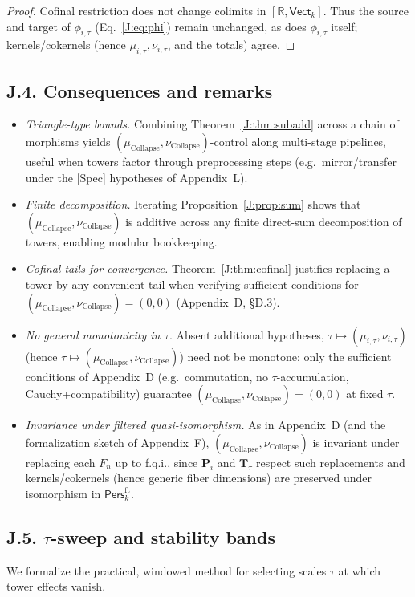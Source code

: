 \documentclass[11pt]{article}
\numberwithin{equation}{section}
\theoremstyle{plain}
\theoremstyle{definition}
\theoremstyle{remark}
\newcommand{\Pers}{\mathsf{Pers}}
\theoremstyle{plain}
\theoremstyle{definition}
\numberwithin{equation}{section}
\theoremstyle{definition}
\DeclareRobustCommand{\muc}{\mu_{\mathrm{Collapse}}}
\DeclareRobustCommand{\nuc}{\nu_{\mathrm{Collapse}}}
\numberwithin{equation}{section}
\theoremstyle{plain}
\theoremstyle{definition}
\theoremstyle{remark}
\providecommand{\muc}{\mu_{\mathrm{Collapse}}}
\providecommand{\nuc}{\nu_{\mathrm{Collapse}}}
\begin{document}
\begin{proof}
Cofinal restriction does not change colimits in \([\mathbb{R},\mathsf{Vect}_k]\).
Thus the source and target of \(\phi_{i,\tau}\) (Eq.~\eqref{J:eq:phi}) remain unchanged, as does \(\phi_{i,\tau}\) itself; kernels/cokernels (hence \(\mu_{i,\tau},\nu_{i,\tau}\), and the totals) agree.
\end{proof}

\subsection*{J.4. Consequences and remarks}
\begin{itemize}\itemsep0.25em
  \item \emph{Triangle-type bounds.} Combining Theorem~\ref{J:thm:subadd} across a chain of morphisms yields \((\muc,\nuc)\)-control along multi-stage pipelines, useful when towers factor through preprocessing steps (e.g.\ mirror/transfer under the [Spec] hypotheses of Appendix~L).
  \item \emph{Finite decomposition.} Iterating Proposition~\ref{J:prop:sum} shows that \((\muc,\nuc)\) is additive across any finite direct-sum decomposition of towers, enabling modular bookkeeping.
  \item \emph{Cofinal tails for convergence.} Theorem~\ref{J:thm:cofinal} justifies replacing a tower by any convenient tail when verifying sufficient conditions for \((\muc,\nuc)=(0,0)\) (Appendix~D, §D.3).
  \item \emph{No general monotonicity in \(\tau\).} Absent additional hypotheses, \(\tau\mapsto(\mu_{i,\tau},\nu_{i,\tau})\) (hence \(\tau\mapsto(\muc,\nuc)\)) need not be monotone; only the sufficient conditions of Appendix~D (e.g.\ commutation, no \(\tau\)-accumulation, Cauchy+compatibility) guarantee \((\muc,\nuc)=(0,0)\) at fixed \(\tau\).
  \item \emph{Invariance under filtered quasi-isomorphism.} As in Appendix~D (and the formalization sketch of Appendix~F), \((\muc,\nuc)\) is invariant under replacing each \(F_n\) up to f.q.i., since \(\mathbf{P}_i\) and \(\mathbf{T}_\tau\) respect such replacements and kernels/cokernels (hence generic fiber dimensions) are preserved under isomorphism in \(\Pers^{\mathrm{ft}}_k\).
\end{itemize}

\subsection*{J.5. \texorpdfstring{$\tau$}{tau}-sweep and stability bands}
We formalize the practical, windowed method for selecting scales \(\tau\) at which tower effects vanish.
\end{document}
